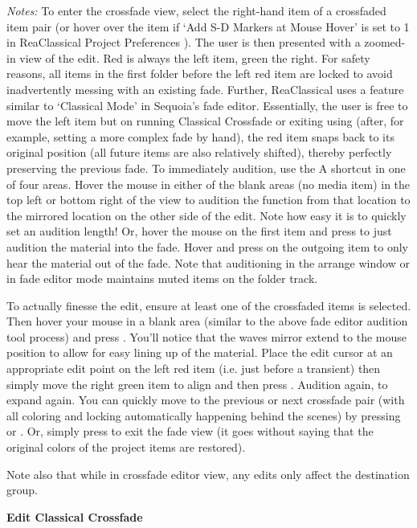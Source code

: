 \documentclass[10pt,american]{article}
\begin{document}
\emph{Notes: }To enter the crossfade view, select the right-hand item of a
crossfaded item pair (or hover over the item if `Add S-D Markers at Mouse Hover'
is set to 1 in ReaClassical Project Preferences ). The user is then
presented with a zoomed-in view of the edit. Red is always the left item, green
the right. For safety reasons, all items in the first folder before the left red
item are locked to avoid inadvertently messing with an existing fade. Further,
ReaClassical uses a feature similar to `Classical Mode' in Sequoia's fade
editor. Essentially, the user is free to move the left item but on running
Classical Crossfade  or exiting using  (after, for example,
setting a more complex fade by hand), the red item snaps back to its original
position (all future items are also relatively shifted), thereby perfectly
preserving the previous fade. To immediately audition, use the A shortcut in one
of four areas. Hover the mouse in either of the blank areas (no media item) in
the top left or bottom right of the view to audition the function from that
location to the mirrored location on the other side of the edit. Note how easy
it is to quickly set an audition length! Or, hover the mouse on the first item
and press  to just audition the material into the fade. Hover and press
 on the outgoing item to only hear the material out of the fade. Note
that auditioning in the arrange window or in fade editor mode maintains muted
items on the folder track.

To actually finesse the edit, ensure at least one of the crossfaded items is
selected. Then hover your mouse in a blank area (similar to the above fade
editor audition tool process) and press . You'll notice that the waves
mirror extend to the mouse position to allow for easy lining up of the material.
Place the edit cursor at an appropriate edit point on the left red item (i.e.
just before a transient) then simply move the right green item to align and then
press . Audition again,  to expand again. You can quickly move
to the previous or next crossfade pair (with all coloring and locking
automatically happening behind the scenes) by pressing  or . Or,
simply press  to exit the fade view (it goes without saying that the
original colors of the project items are restored).

Note also that while in crossfade editor view, any edits only affect the
destination group.

\textbf{Edit Classical Crossfade }
\end{document}
